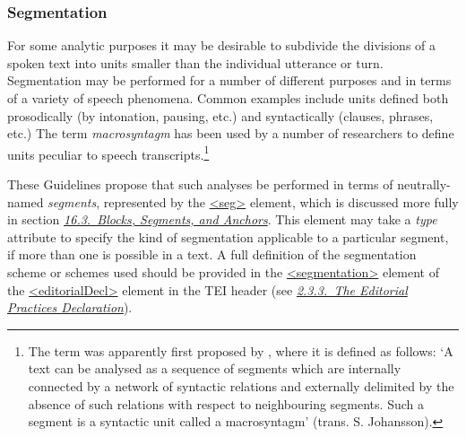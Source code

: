 \subsubsection[{Segmentation}]{Segmentation}\label{TSSASE}\par
For some analytic purposes it may be desirable to subdivide the divisions of a spoken text into units smaller than the individual utterance or turn. Segmentation may be performed for a number of different purposes and in terms of a variety of speech phenomena. Common examples include units defined both prosodically (by intonation, pausing, etc.) and syntactically (clauses, phrases, etc.) The term \textit{macrosyntagm} has been used by a number of researchers to define units peculiar to speech transcripts.\footnote{The term was apparently first proposed by \cite{TS-BIBL-7}, where it is defined as follows: ‘A text can be analysed as a sequence of segments which are internally connected by a network of syntactic relations and externally delimited by the absence of such relations with respect to neighbouring segments. Such a segment is a syntactic unit called a macrosyntagm’ (trans. S. Johansson).}\par
These Guidelines propose that such analyses be performed in terms of neutrally-named \textit{segments}, represented by the \hyperref[TEI.seg]{<seg>} element, which is discussed more fully in section \textit{\hyperref[SASE]{16.3.\ Blocks, Segments, and Anchors}}. This element may take a {\itshape type} attribute to specify the kind of segmentation applicable to a particular segment, if more than one is possible in a text. A full definition of the segmentation scheme or schemes used should be provided in the \hyperref[TEI.segmentation]{<segmentation>} element of the \hyperref[TEI.editorialDecl]{<editorialDecl>} element in the TEI header (see \textit{\hyperref[HD53]{2.3.3.\ The Editorial Practices Declaration}}).\par
